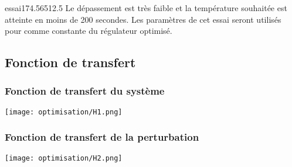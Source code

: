 \begin{optibox}{essai17}{4.5}{65}{12.5}
Le dépassement est très faible et la température souhaitée est atteinte en moins de 200 secondes. 
Les paramètres de cet essai seront utilisés pour comme constante du régulateur optimisé.
\\\hline
\end{optibox}



\subsection{Fonction de transfert}
\subsubsection{Fonction de transfert du système}
\begin{center}\texttt{[image: optimisation/H1.png]}\end{center}
\subsubsection{Fonction de transfert de la perturbation}
\begin{center}\texttt{[image: optimisation/H2.png]}\end{center}

